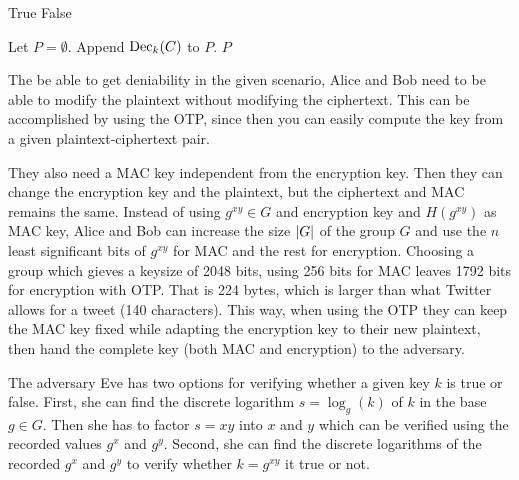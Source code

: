 \begin{algorithm}
  \caption{%
    Algorithm for finding possible plaintexts and discarding false keys.
  }
  \label{alg:falsekeys}
  \hrulefill
  \begin{algorithmic}
        \State \Return True
      \EndIf
      \State \Return False
    \EndFunction

    \Statex
      \State Let $P = \emptyset$.
          \State Append $\operatorname{\mathrm{Dec}}_k( C )$ to $P$.
        \EndIf
      \EndFor
      \State \Return $P$
    \EndFunction
  \end{algorithmic}
  \hrulefill
\end{algorithm}

The be able to get deniability in the given scenario, Alice and Bob need to be 
able to modify the plaintext without modifying the ciphertext.
This can be accomplished by using the \ac{OTP}, since then you can easily 
compute the key from a given plaintext-ciphertext pair.

They also need a \ac{MAC} key independent from the encryption key.
Then they can change the encryption key and the plaintext, but the ciphertext 
and \ac{MAC} remains the same.
Instead of using \(g^{xy}\in G\) and encryption key and \(H(g^{xy})\) as 
\ac{MAC} key, Alice and Bob can increase the size \(|G|\) of the group \(G\) 
and use the \(n\) least significant bits of \(g^{xy}\) for \ac{MAC} and the 
rest for encryption.
Choosing a group which gieves a keysize of 2048 bits, using 256 bits for 
\ac{MAC} leaves 1792 bits for encryption with \ac{OTP}.
That is 224 bytes, which is larger than what Twitter allows for a tweet (140 
characters).
This way, when using the \ac{OTP} they can keep the \ac{MAC} key fixed while 
adapting the encryption key to their new plaintext, then hand the complete key 
(both \ac{MAC} and encryption) to the adversary.

The adversary Eve has two options for verifying whether a given key \(k\) is 
true or false.
First, she can find the discrete logarithm \(s = \log_g( k )\) of \(k\) in the 
base \(g\in G\).
Then she has to factor \(s = xy\) into \(x\) and \(y\) which can be verified 
using the recorded values \(g^x\) and \(g^y\).
Second, she can find the discrete logarithms of the recorded \(g^x\) and 
\(g^y\) to verify whether \(k = g^{xy}\) it true or not.

